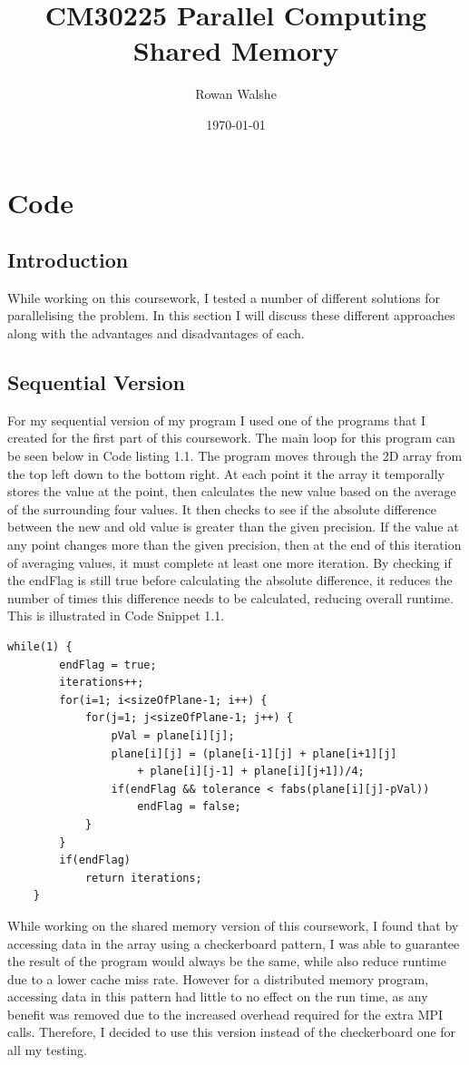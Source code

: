 \documentclass{report}
\title{CM30225 Parallel Computing\\Shared Memory} %
\author{Rowan Walshe} %
\date{\today} %
\begin{document}
\maketitle %
\pagebreak

\chapter{Code}
\section{Introduction}
While working on this coursework, I tested a number of different solutions for parallelising the problem. In this section I will discuss these different approaches along with the advantages and disadvantages of each.

\section{Sequential Version}
For my sequential version of my program I used one of the programs that I created for the first part of this coursework. The main loop for this program can be seen  below in Code listing 1.1. The program moves through the 2D array from the top left down to the bottom right. At each point it the array it temporally stores the value at the point, then calculates the new value based on the average of the surrounding four values. It then checks to see if the absolute difference between the new and old value is greater than the given precision. If the value at any point changes more than the given precision, then at the end of this iteration of averaging values, it must complete at least one more iteration. By checking if the endFlag is still true before calculating the absolute difference, it reduces the number of times this difference needs to be calculated, reducing overall runtime. This is illustrated in Code Snippet 1.1.
\begin{lstlisting}[style=customc,caption=Version 1 Sequential Main Loop]
    while(1) {
        endFlag = true;
        iterations++;
        for(i=1; i<sizeOfPlane-1; i++) {
            for(j=1; j<sizeOfPlane-1; j++) {
                pVal = plane[i][j];
                plane[i][j] = (plane[i-1][j] + plane[i+1][j]
                    + plane[i][j-1] + plane[i][j+1])/4;
                if(endFlag && tolerance < fabs(plane[i][j]-pVal))
                    endFlag = false;
            }
        }
        if(endFlag)
            return iterations;
    }
\end{lstlisting}
While working on the shared memory version of this coursework, I found that by accessing data in the array using a checkerboard pattern, I was able to guarantee the result of the program would always be the same, while also reduce runtime due to a lower cache miss rate. However for a distributed memory program, accessing data in this pattern had little to no effect on the run time, as any benefit was removed due to the increased overhead required for the extra MPI calls. Therefore, I decided to use this version instead of the checkerboard one for all my testing.
\end{document}

